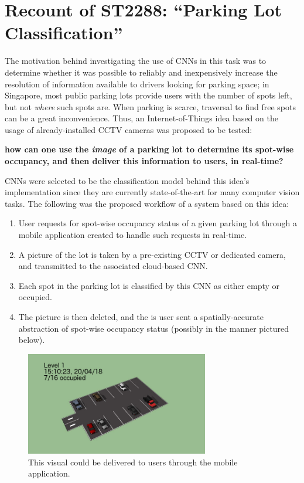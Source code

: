 \documentclass[a4paper, 11pt]{article} %
\begin{document}
\section{Recount of ST2288: ``Parking Lot Classification''}
	The motivation behind investigating the use of CNNs in this task was to determine whether it was 
	possible to reliably and inexpensively increase the resolution of information available to drivers 
	looking for parking space; in Singapore, most public parking lots provide users with the number of 
	spots left, but not \textit{where} such spots are. When parking is scarce, traversal to find free spots 
	can be a great inconvenience. Thus, an Internet-of-Things idea based on the usage of 
	already-installed CCTV cameras was proposed to be tested:
	\begin{center}
		\textbf{
			how can one use the \textit{image} of a parking lot to determine its spot-wise occupancy, and 
			then deliver this information to users, in real-time?
		}
	\end{center}
	CNNs were selected to be the classification model behind this idea's implementation since they are 
	currently state-of-the-art for many computer vision tasks.
	The  following was the proposed workflow of a system based on this idea: 
	\begin{enumerate}
		\item User requests for spot-wise occupancy status of a given parking lot through a mobile 
		application created to handle such requests in real-time.
		\item A picture of the lot is taken by a pre-existing CCTV or dedicated camera, and transmitted to 
		the associated cloud-based CNN.
		\item Each spot in the parking lot is classified by this CNN as either empty or occupied.
		\item The picture is then deleted, and the is user sent a spatially-accurate abstraction of 
		spot-wise occupancy status (possibly in the manner pictured below).
	\end{enumerate}
	\begin{figure}[H]
		\centering
		\includegraphics[width=8cm]{figures/mock-up.jpg}
		\caption{This visual could be delivered to users through the mobile application.}
	\end{figure}
\end{document}
